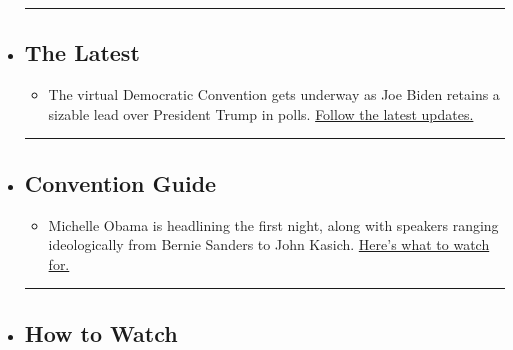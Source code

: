 \begin{itemize}
\item
  \begin{center}\rule{0.5\linewidth}{\linethickness}\end{center}

  \hypertarget{the-latest}{%
  \subsection{The Latest}\label{the-latest}}

  \begin{itemize}
  \tightlist
  \item
    The virtual Democratic Convention gets underway as Joe Biden retains
    a sizable lead over President Trump in polls.
    \href{https://www.nytimes3xbfgragh.onion/live/2020/08/17/us/dnc-convention?action=click\&pgtype=Article\&state=default\&region=BELOW_MAIN_CONTENT\&context=storylines_guide}{Follow
    the latest updates.}
  \end{itemize}
\item
  \begin{center}\rule{0.5\linewidth}{\linethickness}\end{center}

  \hypertarget{convention-guide}{%
  \subsection{Convention Guide}\label{convention-guide}}

  \begin{itemize}
  \tightlist
  \item
    Michelle Obama is headlining the first night, along with speakers
    ranging ideologically from Bernie Sanders to John Kasich.
    \href{https://www.nytimes3xbfgragh.onion/article/dnc-schedule.html?action=click\&pgtype=Article\&state=default\&region=BELOW_MAIN_CONTENT\&context=storylines_guide}{Here's
    what to watch for.}
  \end{itemize}
\item
  \begin{center}\rule{0.5\linewidth}{\linethickness}\end{center}

  \hypertarget{how-to-watch}{%
  \subsection{How to Watch}\label{how-to-watch}}


\end{itemize}

